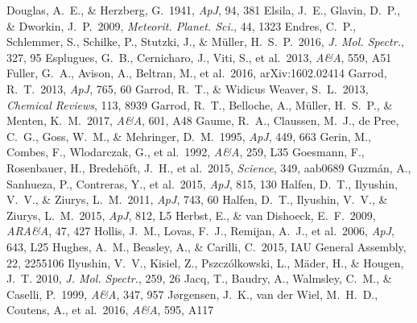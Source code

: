 \documentclass{iau}
\begin{document}
\begin{thebibliography}{}
 Douglas, A.~E., \& 
Herzberg, G.\ 1941, \textit{ApJ}, 94, 381
 Elsila, J.~E., Glavin, D.~P., \& 
Dworkin, J.~P.\ 2009, \textit{Meteorit. Planet. Sci.}, 44, 1323
 Endres, C.~P., Schlemmer, S., 
Schilke, P., Stutzki, J., \& M{\"u}ller, H.~S.~P.\ 2016, 
\textit{J. Mol. Spectr.}, 327, 95 
 Esplugues, G.~B., 
Cernicharo, J., Viti, S., et al.\ 2013, \textit{A\&A}, 559, A51 
 Fuller, G.~A., Avison, A., 
Beltran, M., et al.\ 2016, arXiv:1602.02414 
 Garrod, R.~T.\ 2013, \textit{ApJ}, 765, 60
 Garrod, R.~T., \& Widicus 
Weaver, S.~L.\ 2013, \textit{Chemical Reviews}, 113, 8939 
 Garrod, R.~T., Belloche, A., 
M{\"u}ller, H.~S.~P., \& Menten, K.~M.\ 2017, \textit{A\&A}, 601, A48
 Gaume, R.~A., Claussen, M.~J., 
de Pree, C.~G., Goss, W.~M., \& Mehringer, D.~M.\ 1995, \textit{ApJ}, 449, 663
 Gerin, M., Combes, F., Wlodarczak, G., 
et al.\ 1992, \textit{A\&A}, 259, L35 
 Goesmann, F., Rosenbauer, H., 
Bredeh{\"o}ft, J.~H., et al.\ 2015, \textit{Science}, 349, aab0689
 Guzm\'an, A., Sanhueza, P., 
Contreras, Y., et al.\ 2015, \textit{ApJ}, 815, 130
 Halfen, D.~T., Ilyushin, V.~V., \& 
Ziurys, L.~M.\ 2011, \textit{ApJ}, 743, 60 
 Halfen, D.~T., Ilyushin, V.~V., \& 
Ziurys, L.~M.\ 2015, \textit{ApJ}, 812, L5 
 Herbst, E., \& 
van Dishoeck, E.~F.\ 2009, \textit{ARA\&A}, 47, 427
 Hollis, J.~M., Lovas, F.~J., 
Remijan, A.~J., et al.\ 2006, \textit{ApJ}, 643, L25 
 Hughes, A.~M., Beasley, A., \& 
Carilli, C.\ 2015, IAU General Assembly, 22, 2255106
 Ilyushin, V.~V., Kisiel, Z., 
Pszcz{\'o}lkowski, L., M{\"a}der, H., \& Hougen,  J.~T. 2010, 
\textit{J. Mol. Spectr.}, 259, 26
 Jacq, T., Baudry, A., Walmsley, C.~M., \& 
Caselli, P.\ 1999, \textit{A\&A}, 347, 957 
 J{\o}rgensen, J.~K., 
van der Wiel, M.~H.~D., Coutens, A., et al.\ 2016, \textit{A\&A}, 595, A117 

\end{thebibliography}
\end{document}
